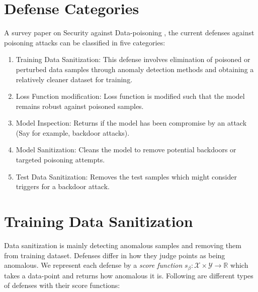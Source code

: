 \documentclass[11pt]{report}
\begin{document}


\maketitle



\section{Defense Categories}
A survey paper on Security against Data-poisoning \cite{10.1145/3585385}, the current defenses against poisoning attacks can be classified in five categories:

\begin{enumerate}[label=\(\circ\), leftmargin=*, widest=b, align=left]
\item Training Data Sanitization: This defense involves elimination of poisoned or perturbed data samples through anomaly detection methods and obtaining a relatively cleaner dataset for training.

\item Loss Function modification: Loss function is modified such that the model remains robust against poisoned samples.

\item Model Inspection: Returns if the model has been compromise by an attack (Say for example, backdoor attacks).

\item Model Sanitization: Cleans the model to remove potential backdoors or targeted poisoning attempts.

\item Test Data Sanitization: Removes the test samples which might consider triggers for a backdoor attack.
\end{enumerate}

\section{Training Data Sanitization}

Data sanitization is mainly detecting anomalous samples and removing them from training dataset. Defenses differ in how they judge points as being anomalous\cite{10.1007/s10994-021-06119-y}. We represent each defense by a \textit{score function} \(s_{\beta}:\mathcal{X}\times\mathcal{Y} \rightarrow \mathbb{R}\) which takes a data-point and returns how anomalous it is. Following are different types of defenses with their score functions:
\end{document}
